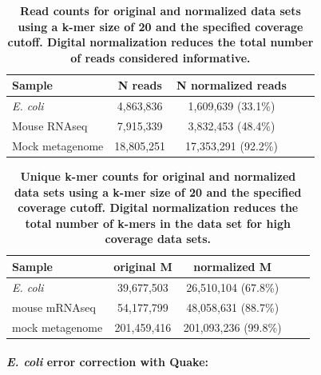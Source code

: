 \documentclass{article}
\begin{document}

\begin{table}
\centering
\begin{tabular}{|l|c|c|c|c|}
\hline
Sample              & N reads    & N normalized reads \\
\hline
{\em E. coli}       & 4,863,836   & 1,609,639 (33.1\%) \\
Mouse RNAseq        & 7,915,339   & 3,832,453 (48.4\%) \\
Mock metagenome     & 18,805,251  & 17,353,291 (92.2\%) \\

\hline
\end{tabular}

\caption{{\bf Read counts for original and normalized data sets using
    a k-mer size of 20 and the specified coverage cutoff. Digital
    normalization reduces the total number of reads considered
    informative.}}
\label{tab:read_counts}
\end{table}


\begin{table}
\centering
\begin{tabular}{|l|c|c|c|c|}
\hline
Sample              & original M & normalized M \\
\hline
{\em E. coli}       & 39,677,503 & 26,510,104 (67.8\%) \\
mouse mRNAseq       & 54,177,799 & 48,058,631 (88.7\%) \\
mock metagenome     & 201,459,416  & 201,093,236 (99.8\%) \\
\hline
\end{tabular}

\caption{{\bf Unique k-mer counts for original and normalized data
    sets using a k-mer size of 20 and the specified coverage cutoff.
    Digital normalization reduces the total number of k-mers in the
    data set for high coverage data sets.}}

\label{tab:kmer_counts}
\end{table}


\paragraph{{\em E. coli} error correction with Quake:}

\end{document}
